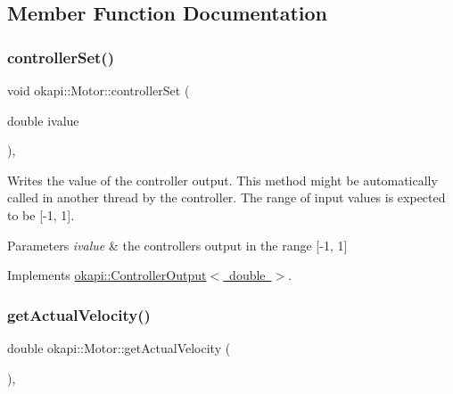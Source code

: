 \subsection{Member Function Documentation}
\mbox{\label{classokapi_1_1Motor_a262c36a80a942d125e574d691b77b440}} 
\subsubsection{\texorpdfstring{controllerSet()}{controllerSet()}}
{\footnotesize\ttfamily void okapi\+::\+Motor\+::controller\+Set (\begin{DoxyParamCaption}\item[{double}]{ivalue }\end{DoxyParamCaption})\hspace{0.3cm}{\ttfamily [override]}, {\ttfamily [virtual]}}

Writes the value of the controller output. This method might be automatically called in another thread by the controller. The range of input values is expected to be \mbox{[}-\/1, 1\mbox{]}.


\begin{DoxyParams}{Parameters}
{\em ivalue} & the controller\textquotesingle{}s output in the range \mbox{[}-\/1, 1\mbox{]} \\
\hline
\end{DoxyParams}


Implements \mbox{\hyperlink{classokapi_1_1ControllerOutput_a360c08f0c10b36f882d6d3100c2cad49}{okapi\+::\+Controller\+Output$<$ double $>$}}.

\mbox{\label{classokapi_1_1Motor_a12dab94ff8e0636c01d3c568d9461655}} 
\subsubsection{\texorpdfstring{getActualVelocity()}{getActualVelocity()}}
{\footnotesize\ttfamily double okapi\+::\+Motor\+::get\+Actual\+Velocity (\begin{DoxyParamCaption}{ }\end{DoxyParamCaption})\hspace{0.3cm}{\ttfamily [override]}, {\ttfamily [virtual]}}

